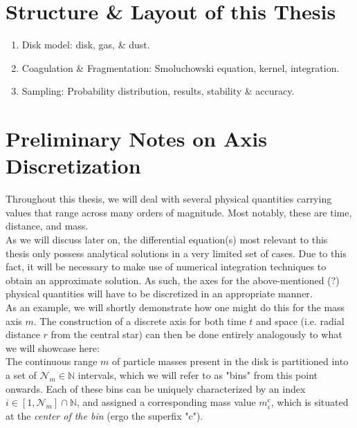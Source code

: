 \section{Structure \& Layout of this Thesis}

    \begin{enumerate}
        \item Disk model: disk, gas, \& dust.
        \item Coagulation \& Fragmentation: Smoluchowski equation, kernel, integration.
        \item Sampling: Probability distribution, results, stability \& accuracy.
    \end{enumerate}

\newpage
\section{Preliminary Notes on Axis Discretization}

    Throughout this thesis, we will deal with several physical quantities carrying values that 
    range across many orders of magnitude. Most notably, these are time, distance, and mass. \\

    As we will discuss later on, the differential equation(s) most relevant to this thesis only 
    possess analytical solutions in a very limited set of cases. Due to this fact, it will be
    necessary to make use of numerical integration techniques to obtain an approximate solution.
    As such, the axes for the above-mentioned (?) physical quantities will have to be discretized 
    in an appropriate manner. \\

    As an example, we will shortly demonstrate how one might do this for the mass axis $m$. The
    construction of a discrete axis for both time $t$ and space (i.e. radial distance $r$ from the
    central star) can then be done entirely analogously to what we will showcase here: \\

    The continuous range $m$ of particle masses present in the disk is partitioned into a set of 
    $\mathcal N_m\in\mathbb N$ intervals, which we will refer to as "bins" from this point onwards. 
    Each of these bins can be uniquely characterized by an index 
    $i\in[1,\mathcal N_m]\cap\mathbb N$, and assigned a corresponding mass value $m_i^\text{c}$, 
    which is situated at the \textit{center of the bin} (ergo the superfix "c").\\
    
